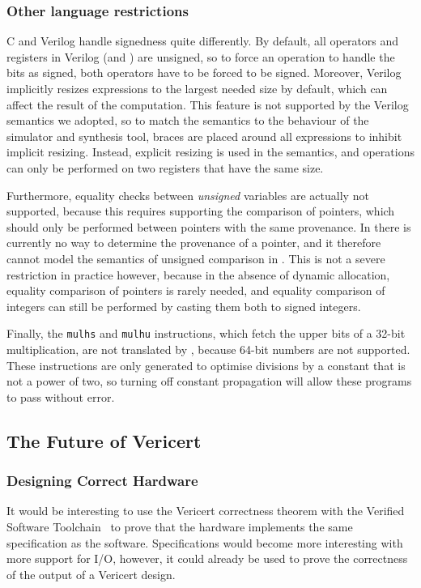 \subsubsection{Other language restrictions}

C and Verilog handle signedness quite differently. By default, all operators and
registers in Verilog (and \htl{}) are unsigned, so to force an operation to
handle the bits as signed, both operators have to be forced to be
signed. Moreover, Verilog implicitly resizes expressions to the largest needed
size by default, which can affect the result of the computation.  This feature
is not supported by the Verilog semantics we adopted, so to match the semantics
to the behaviour of the simulator and synthesis tool, braces are placed around
all expressions to inhibit implicit resizing.  Instead, explicit resizing is
used in the semantics, and operations can only be performed on two registers
that have the same size.

Furthermore, equality checks between \emph{unsigned} variables are actually not
supported, because this requires supporting the comparison of pointers, which
should only be performed between pointers with the same provenance.  In
\vericert{} there is currently no way to determine the provenance of a pointer,
and it therefore cannot model the semantics of unsigned comparison in
\compcert{}. This is not a severe restriction in practice however, because in
the absence of dynamic allocation, equality comparison of pointers is rarely
needed, and equality comparison of integers can still be performed by casting
them both to signed integers.

Finally, the \texttt{mulhs} and \texttt{mulhu} instructions, which fetch the
upper bits of a 32-bit multiplication, are not translated by \vericert{},
because 64-bit numbers are not supported. These instructions are only generated
to optimise divisions by a constant that is not a power of two, so turning off
constant propagation will allow these programs to pass without error.

\subsection{The Future of Vericert}

\subsubsection{Designing Correct Hardware}

It would be interesting to use the Vericert correctness theorem with the
Verified Software Toolchain~\cite{appel11_verif_softw_toolc} to prove that the
hardware implements the same specification as the software.  Specifications
would become more interesting with more support for I/O, however, it could
already be used to prove the correctness of the output of a Vericert design.

